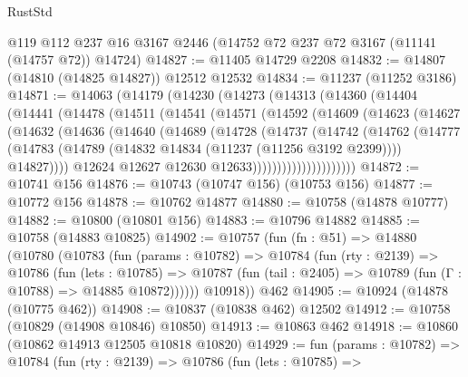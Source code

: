 \begin{lexlean}{RustStd}
\begin{coremodule}
    @119
    @112
    @237
    @16
    @3167
    @2446
    (@14752 @72 @237 @72 @3167 (@11141 (@14757 @72)) @14724)
@14827 := @11405 @14729 @2208
@14832 := @14807 (@14810 (@14825 @14827)) @12512 @12532
@14834 := @11237 (@11252 @3186)
@14871 := @14063
    (@14179
      (@14230
        (@14273
          (@14313
            (@14360
              (@14404
                (@14441
                  (@14478
                    (@14511
                      (@14541
                        (@14571
                          (@14592
                            (@14609
                              (@14623
                                (@14627
                                  (@14632
                                    (@14636
                                      (@14640
                                        (@14689
                                          (@14728
                                            (@14737
                                              (@14742
                                                (@14762
                                                  (@14777
                                                    (@14783
                                                      (@14789
                                                        (@14832
                                                          @14834
                                                          (@11237 (@11256 @3192 @2399))))
                                                      @14827))))
                                              @12624
                                              @12627
                                              @12630
                                              @12633)))))))))))))))))))))
@14872 := @10741 @156
@14876 := @10743 (@10747 @156) (@10753 @156)
@14877 := @10772 @156
@14878 := @10762 @14877
@14880 := @10758 (@14878 @10777)
@14882 := @10800 (@10801 @156)
@14883 := @10796 @14882
@14885 := @10758 (@14883 @10825)
@14902 := @10757
    (fun (fn : @51) =>
    @14880
      (@10780
        (@10783
          (fun (params : @10782) =>
          @10784
            (fun (rty : @2139) =>
            @10786
              (fun (lets : @10785) =>
              @10787 (fun (tail : @2405) => @10789 (fun (Γ : @10788) => @14885 @10872))))))
        @10918))
    @462
@14905 := @10924 (@14878 (@10775 @462))
@14908 := @10837 (@10838 @462) @12502
@14912 := @10758 (@10829 (@14908 @10846) @10850)
@14913 := @10863 @462
@14918 := @10860 (@10862 @14913 @12505 @10818 @10820)
@14929 := fun (params : @10782) =>
  @10784
    (fun (rty : @2139) =>
    @10786
      (fun (lets : @10785) =>

\end{coremodule}
\end{lexlean}
